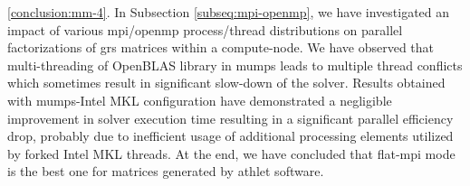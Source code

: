 


	
\ref{conclusion:mm-4}. In Subsection \ref{subseq:mpi-openmp}, we have investigated an impact of various
\acrshort{mpi}/\acrshort{openmp} process/thread distributions on parallel factorizations of \acrshort{grs} matrices  within a compute-node. We have observed that multi-threading of
OpenBLAS library in \acrshort{mumps} leads to multiple thread conflicts which sometimes result in significant slow-down of the solver. Results obtained with \acrshort{mumps}-Intel MKL configuration have demonstrated a negligible improvement in solver execution time resulting in a significant parallel efficiency drop, probably due to inefficient usage of additional processing elements utilized by forked Intel MKL threads. At the end, we have concluded that flat-\acrshort{mpi} mode is the best one for matrices generated by \acrshort{athlet} software.\\






